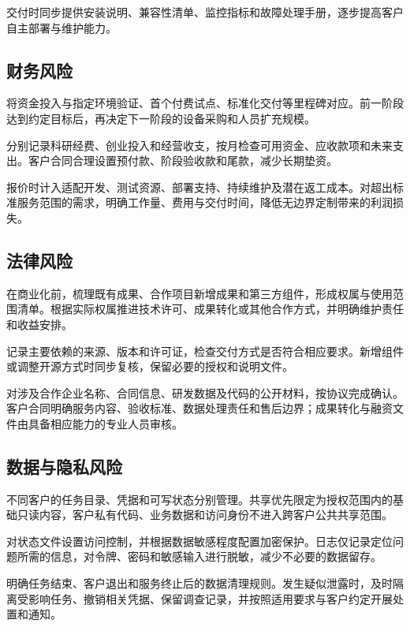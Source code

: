 交付时同步提供安装说明、兼容性清单、监控指标和故障处理手册，逐步提高客户自主部署与维护能力。

\subsection{财务风险}\label{sec:7.2.3}
将资金投入与指定环境验证、首个付费试点、标准化交付等里程碑对应。前一阶段达到约定目标后，再决定下一阶段的设备采购和人员扩充规模。

分别记录科研经费、创业投入和经营收支，按月检查可用资金、应收款项和未来支出。客户合同合理设置预付款、阶段验收款和尾款，减少长期垫资。

报价时计入适配开发、测试资源、部署支持、持续维护及潜在返工成本。对超出标准服务范围的需求，明确工作量、费用与交付时间，降低无边界定制带来的利润损失。

\subsection{法律风险}\label{sec:7.2.4}
在商业化前，梳理既有成果、合作项目新增成果和第三方组件，形成权属与使用范围清单。根据实际权属推进技术许可、成果转化或其他合作方式，并明确维护责任和收益安排。

记录主要依赖的来源、版本和许可证，检查交付方式是否符合相应要求。新增组件或调整开源方式时同步复核，保留必要的授权和说明文件。

对涉及合作企业名称、合同信息、研发数据及代码的公开材料，按协议完成确认。客户合同明确服务内容、验收标准、数据处理责任和售后边界；成果转化与融资文件由具备相应能力的专业人员审核。

\subsection{数据与隐私风险}\label{sec:7.2.5}
不同客户的任务目录、凭据和可写状态分别管理。共享优先限定为授权范围内的基础只读内容，客户私有代码、业务数据和访问身份不进入跨客户公共共享范围。

对状态文件设置访问控制，并根据数据敏感程度配置加密保护。日志仅记录定位问题所需的信息，对令牌、密码和敏感输入进行脱敏，减少不必要的数据留存。

明确任务结束、客户退出和服务终止后的数据清理规则。发生疑似泄露时，及时隔离受影响任务、撤销相关凭据、保留调查记录，并按照适用要求与客户约定开展处置和通知。

